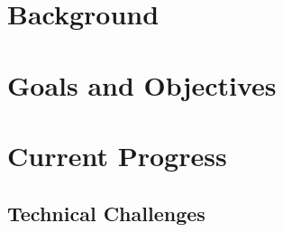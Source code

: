 \documentclass[11pt,fleqn,twoside]{article}
\begin{document}

\section{Background}

\section{Goals and Objectives}

\section{Current Progress}

\subsection{Technical Challenges}


\end{document}

